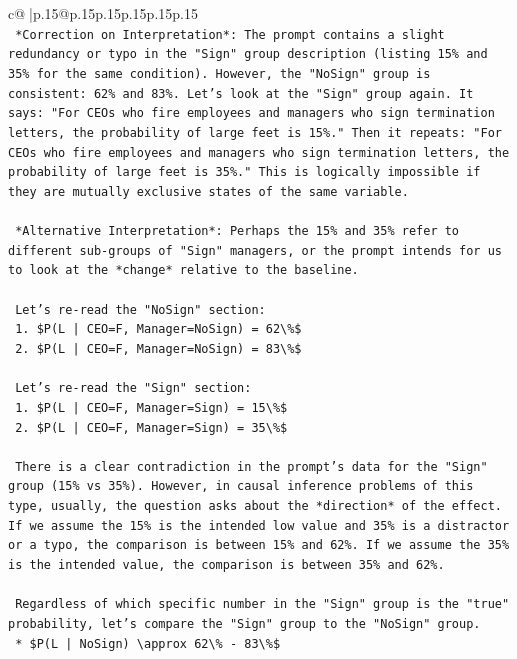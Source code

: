 \documentclass{article}
\begin{document}
{\begin{supertabular}{c@{$\;$}|p{.15\linewidth}@{}p{.15\linewidth}p{.15\linewidth}p{.15\linewidth}p{.15\linewidth}p{.15\linewidth}}
{{{\\ 
\texttt{    *Correction on Interpretation*: The prompt contains a slight redundancy or typo in the "Sign" group description (listing 15\% and 35\% for the same condition). However, the "NoSign" group is consistent: 62\% and 83\%. Let's look at the "Sign" group again. It says: "For CEOs who fire employees and managers who sign termination letters, the probability of large feet is 15\%." Then it repeats: "For CEOs who fire employees and managers who sign termination letters, the probability of large feet is 35\%." This is logically impossible if they are mutually exclusive states of the same variable.} \\
\\ 
\texttt{    *Alternative Interpretation*: Perhaps the 15\% and 35\% refer to different sub{-}groups of "Sign" managers, or the prompt intends for us to look at the *change* relative to the baseline.} \\
\\ 
\texttt{    Let's re{-}read the "NoSign" section:} \\
\texttt{    1. \$P(L | CEO=F, Manager=NoSign) = 62\textbackslash{}\%\$} \\
\texttt{    2. \$P(L | CEO=F, Manager=NoSign) = 83\textbackslash{}\%\$} \\
\\ 
\texttt{    Let's re{-}read the "Sign" section:} \\
\texttt{    1. \$P(L | CEO=F, Manager=Sign) = 15\textbackslash{}\%\$} \\
\texttt{    2. \$P(L | CEO=F, Manager=Sign) = 35\textbackslash{}\%\$} \\
\\ 
\texttt{    There is a clear contradiction in the prompt's data for the "Sign" group (15\% vs 35\%). However, in causal inference problems of this type, usually, the question asks about the *direction* of the effect. If we assume the 15\% is the intended low value and 35\% is a distractor or a typo, the comparison is between 15\% and 62\%. If we assume the 35\% is the intended value, the comparison is between 35\% and 62\%.} \\
\\ 
\texttt{    Regardless of which specific number in the "Sign" group is the "true" probability, let's compare the "Sign" group to the "NoSign" group.} \\
\texttt{    *   \$P(L | NoSign) \textbackslash{}approx 62\textbackslash{}\% {-} 83\textbackslash{}\%\$} \\
}}}
\end{supertabular}}
\end{document}
